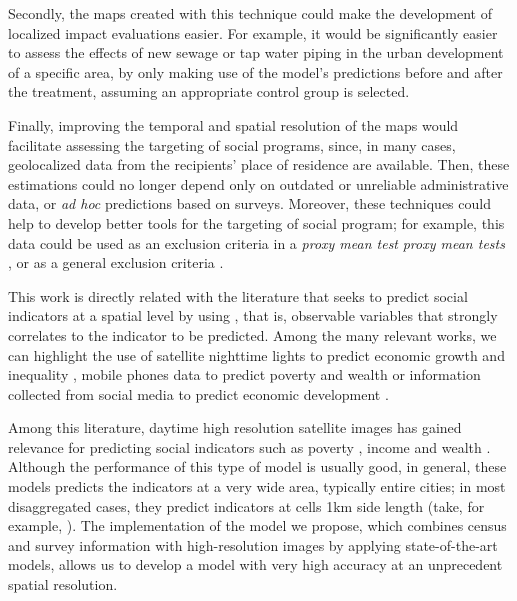 \documentclass[conference]{IEEEtran}
\begin{document}
Secondly, the maps created with this technique could make the development of localized impact evaluations easier. For example, it would be significantly easier to assess the effects of new sewage or tap water piping in the urban development of a specific area, by only making use of the model’s predictions before and after the treatment, assuming an appropriate control group is selected.

Finally, improving the temporal and spatial resolution of the maps would facilitate assessing the targeting of social programs, since, in many cases, geolocalized data from the recipients' place of residence are available. Then, these estimations could no longer depend only on outdated or unreliable administrative data, or \textit{ad hoc} predictions based on surveys. Moreover, these techniques could help to develop better tools for the targeting of social program; for example, this data could be used as an exclusion criteria in a \textit{proxy mean test} \textit{proxy mean tests} \citep{Grosh1995}, or as a general exclusion criteria \citep{Smythe2022}.

This work is directly related with the literature that seeks to predict social indicators at a spatial level by using , that is, observable variables that strongly correlates to the indicator to be predicted. Among the many relevant works, we can highlight the use of satellite nighttime lights to predict economic growth \citep{Henderson2012} and inequality \citep{Ciaschi2021}, mobile phones data to predict poverty and wealth \citep{Blumenstock2015, Steele2017} or information collected from social media to predict economic development \citep{Weber2018, wikipedia}.

Among this literature, daytime high resolution satellite images has gained relevance for predicting social indicators such as poverty \citep{Jean2016, Engstrom2022}, income \citep{Khachiyan2022, Piaggesi2019, rolf_generalizable_2021} and wealth \citep{Yeh2020, meta_wealth_index}. Although the performance of this type of model is usually good, in general, these models predicts the indicators at a very wide area, typically entire cities; in most disaggregated cases, they predict indicators at cells 1km side length (take, for example, \citet{Piaggesi2019}). The implementation of the model we propose, which combines census and survey information with high-resolution images by applying state-of-the-art models, allows us to develop a model with very high accuracy at an unprecedent spatial resolution.
\end{document}
